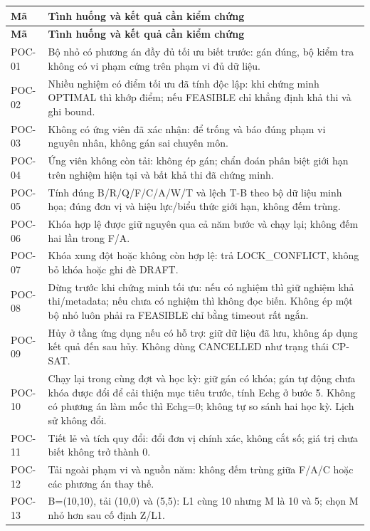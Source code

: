 \documentclass[12pt,a4paper]{report}
\begin{document}
\begin{longtable}{|p{1.6cm}|p{12.3cm}|}
\hline
\textbf{Mã} & \textbf{Tình huống và kết quả cần kiểm chứng} \\\hline
\endfirsthead
\hline
\textbf{Mã} & \textbf{Tình huống và kết quả cần kiểm chứng} \\\hline
\endhead
POC-01 & Bộ nhỏ có phương án đầy đủ tối ưu biết trước: gán đúng, bộ kiểm tra không có vi phạm cứng trên phạm vi đủ dữ liệu. \\\hline
POC-02 & Nhiều nghiệm có điểm tối ưu đã tính độc lập: khi chứng minh OPTIMAL thì khớp điểm; nếu FEASIBLE chỉ khẳng định khả thi và ghi bound. \\\hline
POC-03 & Không có ứng viên đã xác nhận: để trống và báo đúng phạm vi nguyên nhân, không gán sai chuyên môn. \\\hline
POC-04 & Ứng viên không còn tải: không ép gán; chẩn đoán phân biệt giới hạn trên nghiệm hiện tại và bất khả thi đã chứng minh. \\\hline
POC-05 & Tính đúng B/R/Q/F/C/A/W/T và lệch T-B theo bộ dữ liệu minh họa; đúng đơn vị và hiệu lực/biểu thức giới hạn, không đếm trùng. \\\hline
POC-06 & Khóa hợp lệ được giữ nguyên qua cả năm bước và chạy lại; không đếm hai lần trong F/A. \\\hline
POC-07 & Khóa xung đột hoặc không còn hợp lệ: trả LOCK\_CONFLICT, không bỏ khóa hoặc ghi đè DRAFT. \\\hline
POC-08 & Dừng trước khi chứng minh tối ưu: nếu có nghiệm thì giữ nghiệm khả thi/metadata; nếu chưa có nghiệm thì không đọc biến. Không ép một bộ nhỏ luôn phải ra FEASIBLE chỉ bằng timeout rất ngắn. \\\hline
POC-09 & Hủy ở tầng ứng dụng nếu có hỗ trợ: giữ dữ liệu đã lưu, không áp dụng kết quả đến sau hủy. Không dùng CANCELLED như trạng thái CP-SAT. \\\hline
POC-10 & Chạy lại trong cùng đợt và học kỳ: giữ gán có khóa; gán tự động chưa khóa được đổi để cải thiện mục tiêu trước, tính Echg ở bước 5. Không có phương án làm mốc thì Echg=0; không tự so sánh hai học kỳ. Lịch sử không đổi. \\\hline
POC-11 & Tiết lẻ và tích quy đổi: đổi đơn vị chính xác, không cắt số; giá trị chưa biết không trở thành 0. \\\hline
POC-12 & Tải ngoài phạm vi và nguồn năm: không đếm trùng giữa F/A/C hoặc các phương án thay thế. \\\hline
POC-13 & B=(10,10), tải (10,0) và (5,5): L1 cùng 10 nhưng M là 10 và 5; chọn M nhỏ hơn sau cố định Z/L1. \\\hline

\end{longtable}
\end{document}
